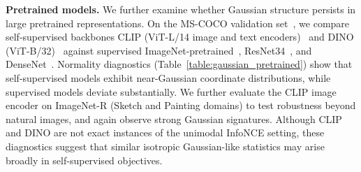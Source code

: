 \documentclass{article}
\begin{document}
\noindent \textbf{Pretrained models.}
We further examine whether Gaussian structure persists in large pretrained representations.
On the MS-COCO validation set~\citep{lin2014microsoft}, we compare self-supervised backbones CLIP (ViT-L/14 image and text encoders)~\citep{radford2021learning} and DINO (ViT-B/32)~\citep{caron2021emerging} against supervised ImageNet-pretrained~\citep{deng2009imagenet}, ResNet34~\citep{he2016deep}, and DenseNet~\citep{huang2017densely}.
Normality diagnostics (Table~\ref{table:gaussian_pretrained}) show that self-supervised models exhibit near-Gaussian coordinate distributions, while supervised models deviate substantially.
We further evaluate the CLIP image encoder on ImageNet-R (Sketch and Painting domains) to test robustness beyond natural images, and again observe strong Gaussian signatures.
Although CLIP and DINO are not exact instances of the unimodal InfoNCE setting, these diagnostics suggest that similar isotropic Gaussian-like statistics may arise broadly in self-supervised objectives.
\end{document}
